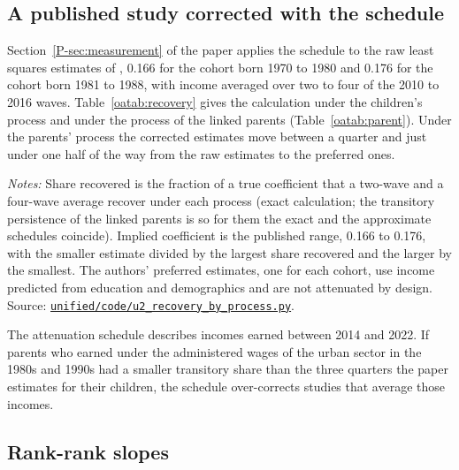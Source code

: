 \documentclass[11pt]{article}
\numberwithin{equation}{section}
\newcommand{\repourl}{https://github.com/JiachenJin1001/before-the-labor-market-or-inside-it}
\newcommand{\code}[1]{\href{\repourl/blob/main/#1}{\nolinkurl{#1}}}
\begin{document}
\subsection{A published study corrected with the schedule}
\label{oa:recovery}

Section~\ref{P-sec:measurement} of the paper applies the schedule to the raw least squares estimates of \citet{FanYiZhang2021}, 0.166 for the cohort born 1970 to 1980 and 0.176 for the cohort born 1981 to 1988, with income averaged over two to four of the 2010 to 2016 waves. Table~\ref{oatab:recovery} gives the calculation under the children's process and under the process of the linked parents (Table~\ref{oatab:parent}). Under the parents' process the corrected estimates move between a quarter and just under one half of the way from the raw estimates to the preferred ones.

\begin{table}[H]
\centering
\small
\caption{Raw estimates of \citet{FanYiZhang2021} divided by the share of the coefficient recovered.}
\label{oatab:recovery}
\setlength{\tabcolsep}{3pt}

\par\smallskip
\begin{minipage}{0.92\textwidth}
\footnotesize\emph{Notes:} Share recovered is the fraction of a true coefficient that a two-wave and a four-wave average recover under each process (exact calculation; the transitory persistence of the linked parents is  so for them the exact and the approximate schedules coincide). Implied coefficient is the published range, 0.166 to 0.176, with the smaller estimate divided by the largest share recovered and the larger by the smallest. The authors' preferred estimates, one for each cohort, use income predicted from education and demographics and are not attenuated by design. Source: \code{unified/code/u2_recovery_by_process.py}.
\end{minipage}
\end{table}

The attenuation schedule describes incomes earned between 2014 and 2022. If parents who earned under the administered wages of the urban sector in the 1980s and 1990s had a smaller transitory share than the three quarters the paper estimates for their children, the schedule over-corrects studies that average those incomes.

\subsection{Rank-rank slopes}
\label{oa:rank}
\end{document}
